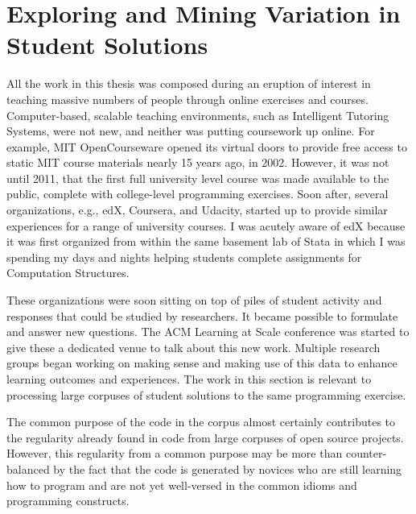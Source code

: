 \section{Exploring and Mining Variation in Student Solutions}

All the work in this thesis was composed during an eruption of interest in teaching massive numbers of people through online exercises and courses. Computer-based, scalable teaching environments, such as Intelligent Tutoring Systems, were not new, and neither was putting coursework up online. For example, MIT OpenCourseware opened its virtual doors to provide free access to static MIT course materials nearly 15 years ago, in 2002. However, it was not until 2011, that the first full university level course was made available to the public, complete with college-level programming exercises. Soon after, several organizations, e.g., edX, Coursera, and Udacity, started up to provide similar experiences for a range of university courses. I was acutely aware of edX because it was first organized from within the same basement lab of Stata in which I was spending my days and nights helping students complete assignments for Computation Structures.


These organizations were soon sitting on top of piles of student activity and responses that could be studied by researchers. It became possible to formulate and answer new questions. The ACM Learning at Scale conference was started to give these a dedicated venue to talk about this new work. Multiple research groups began working on making sense and making use of this data to enhance learning outcomes and experiences. The work in this section is relevant to processing large corpuses of student solutions to the same programming exercise. %

The common purpose of the code in the corpus almost certainly contributes to the regularity already found in code from large corpuses of open source projects. However, this regularity from a common purpose may be more than counter-balanced by the fact that the code is generated by novices who are still learning how to program and are not yet well-versed in the common idioms and programming constructs. 


